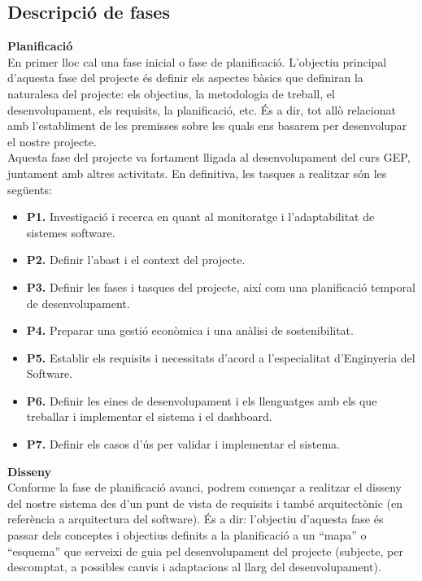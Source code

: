 \subsection{Descripció de fases}

\noindent \textbf{\large Planificació}\\

\noindent En primer lloc cal una fase inicial o fase de planificació. L’objectiu principal d’aquesta fase del projecte és definir els aspectes bàsics que definiran la naturalesa del projecte: els objectius, la metodologia de treball, el desenvolupament, els requisits, la planificació, etc. És a dir, tot allò relacionat amb l’establiment de les premisses sobre les quals ens basarem per desenvolupar el nostre projecte. \\

Aquesta fase del projecte va fortament lligada al desenvolupament del curs GEP, juntament amb altres activitats. En definitiva, les tasques a realitzar són les següents:

\begin{itemize}
\item \textbf{P1.} Investigació i recerca en quant al monitoratge i l’adaptabilitat de sistemes software.
\item \textbf{P2.} Definir l’abast i el context del projecte. 
\item \textbf{P3.} Definir les fases i tasques del projecte, així com una planificació temporal de desenvolupament.
\item \textbf{P4.} Preparar una gestió econòmica i una anàlisi de sostenibilitat.
\item \textbf{P5.} Establir els requisits i necessitats d’acord a l’especialitat d’Enginyeria del Software.
\item \textbf{P6.} Definir les eines de desenvolupament i els llenguatges amb els que treballar i implementar el sistema i el dashboard.
\item \textbf{P7.} Definir els casos d'ús per validar i implementar el sistema.
\end{itemize}

\noindent \textbf{\large Disseny}\\

Conforme la fase de planificació avanci, podrem començar a realitzar el disseny del nostre sistema des d’un punt de vista de requisits i també arquitectònic (en referència a arquitectura del software). És a dir: l’objectiu d’aquesta fase és passar dels conceptes i objectius definits a la planificació a un “mapa” o “esquema” que serveixi de guia pel desenvolupament del projecte (subjecte, per descomptat, a possibles canvis i adaptacions al llarg del desenvolupament). \\

